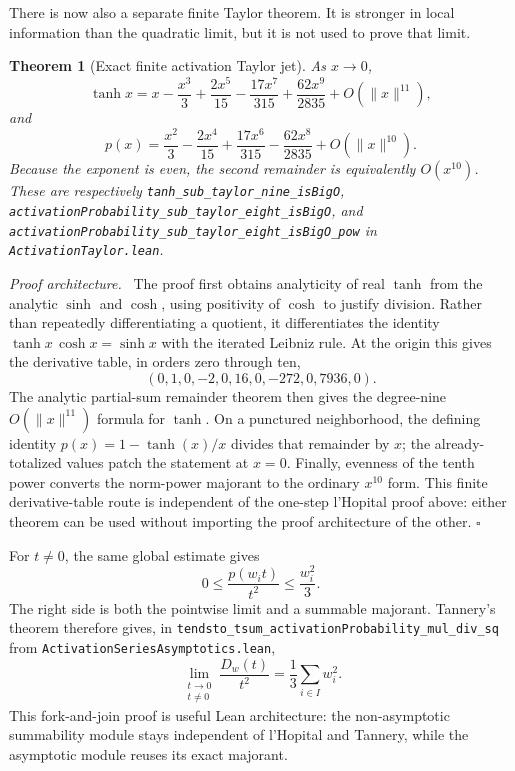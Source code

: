 \documentclass[11pt,oneside]{article}
\newtheorem{theorem}{Theorem}[section]
\theoremstyle{definition}
\theoremstyle{remark}
\newenvironment{proofidea}{\par\smallskip\noindent\textit{Proof architecture.}\ }{\hfill$\square$\par\smallskip}
\begin{document}
There is now also a separate finite Taylor theorem.  It is stronger in local
information than the quadratic limit, but it is not used to prove that limit.

\begin{theorem}[Exact finite activation Taylor jet]
As \(x\to0\),
\[
 \tanh x
 =x-\frac{x^3}{3}+\frac{2x^5}{15}-\frac{17x^7}{315}
   +\frac{62x^9}{2835}+O\!\left(\lVert x\rVert^{11}\right),
\]
and
\[
 p(x)
 =\frac{x^2}{3}-\frac{2x^4}{15}+\frac{17x^6}{315}
   -\frac{62x^8}{2835}+O\!\left(\lVert x\rVert^{10}\right).
\]
Because the exponent is even, the second remainder is equivalently
\(O(x^{10})\).  These are respectively
\nolinkurl{tanh_sub_taylor_nine_isBigO},
\nolinkurl{activationProbability_sub_taylor_eight_isBigO}, and
\nolinkurl{activationProbability_sub_taylor_eight_isBigO_pow} in
\nolinkurl{ActivationTaylor.lean}.
\end{theorem}

\begin{proofidea}
The proof first obtains analyticity of real \(\tanh\) from the analytic
\(\sinh\) and \(\cosh\), using positivity of \(\cosh\) to justify division.
Rather than repeatedly differentiating a quotient, it differentiates the
identity \(\tanh x\,\cosh x=\sinh x\) with the iterated Leibniz rule.  At the
origin this gives the derivative table, in orders zero through ten,
\[
 (0,1,0,-2,0,16,0,-272,0,7936,0).
\]
The analytic partial-sum remainder theorem then gives the degree-nine
\(O(\lVert x\rVert^{11})\) formula for \(\tanh\).  On a punctured
neighborhood, the defining identity \(p(x)=1-\tanh(x)/x\) divides that
remainder by \(x\); the already-totalized values patch the statement at
\(x=0\).  Finally, evenness of the tenth power converts the norm-power
majorant to the ordinary \(x^{10}\) form.  This finite derivative-table route
is independent of the one-step l'Hopital proof above: either theorem can be
used without importing the proof architecture of the other.
\end{proofidea}

For \(t\ne0\), the same global estimate gives
\[
 0\le\frac{p(w_it)}{t^2}\le\frac{w_i^2}{3}.
\]
The right side is both the pointwise limit and a summable majorant.  Tannery's
theorem therefore gives, in
\nolinkurl{tendsto_tsum_activationProbability_mul_div_sq} from
\nolinkurl{ActivationSeriesAsymptotics.lean},
\[
 \boxed{
 \lim_{\substack{t\to0\\t\ne0}}\frac{D_w(t)}{t^2}
 =\frac13\sum_{i\in I}w_i^2.}
\]
This fork-and-join proof is useful Lean architecture: the non-asymptotic
summability module stays independent of l'Hopital and Tannery, while the
asymptotic module reuses its exact majorant.
\end{document}
